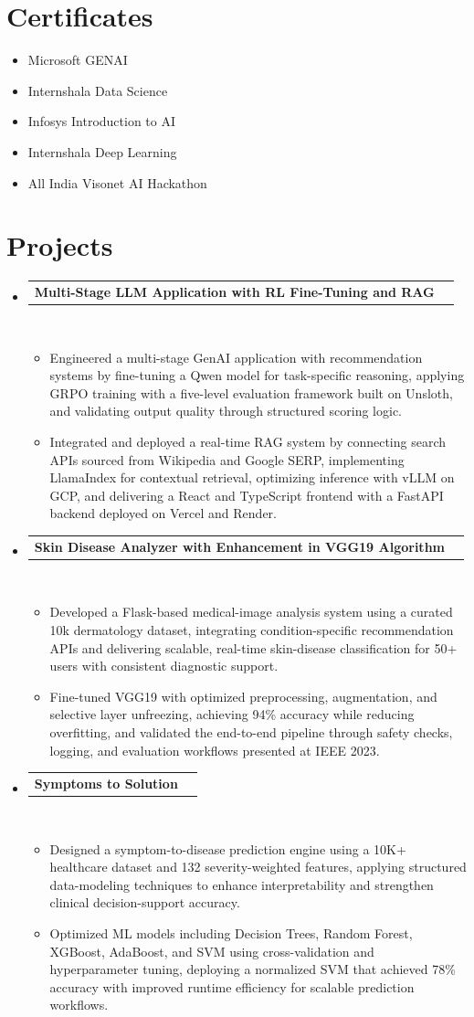 \documentclass[letterpaper,11pt]{article}
\newcommand{\resumeItem}[1]{\item\small{{#1 \vspace{-3pt}}}}
\newcommand{\resumeProjectHeading}[2]{
    \vspace{-3pt}\item
    \begin{tabularx}{0.995\textwidth}[t]{Xr}
      \small\textbf{#1} & #2 \\
    \end{tabularx}\\[-3pt]
    \vspace{3pt}
}
\newcommand{\resumeItemListStart}{\begin{itemize}}
\newcommand{\resumeItemListEnd}{\end{itemize}\vspace{-4pt}}
\newcommand{\resumeSubHeadingListStart}{
  \begin{itemize}[leftmargin=0.12in, label={}]
  \setlength{\itemsep}{0pt}
  \setlength{\parsep}{0pt}
  \setlength{\parskip}{0pt}
}
\newcommand{\resumeSubHeadingListEnd}{\end{itemize}}
\begin{document}
\section{Certificates}
\vspace{-4pt}
\resumeItemListStart
  \resumeItem{Microsoft GENAI}
  \resumeItem{Internshala Data Science}
  \resumeItem{Infosys Introduction to AI}
  \resumeItem{Internshala Deep Learning}
  \resumeItem{All India Visonet AI Hackathon}
\resumeItemListEnd

\section{Projects}
\resumeSubHeadingListStart
\resumeProjectHeading
  {Multi-Stage LLM Application with RL Fine-Tuning and RAG}{}
  \resumeItemListStart
    \resumeItem{Engineered a multi-stage GenAI application with recommendation systems by fine-tuning a Qwen model for task-specific reasoning, applying GRPO training with a five-level evaluation framework built on Unsloth, and validating output quality through structured scoring logic.}
    \resumeItem{Integrated and deployed a real-time RAG system by connecting search APIs sourced from Wikipedia and Google SERP, implementing LlamaIndex for contextual retrieval, optimizing inference with vLLM on GCP, and delivering a React and TypeScript frontend with a FastAPI backend deployed on Vercel and Render.}
  \resumeItemListEnd

\resumeProjectHeading
  {Skin Disease Analyzer with Enhancement in VGG19 Algorithm}{}
  \resumeItemListStart
    \resumeItem{Developed a Flask-based medical-image analysis system using a curated 10k dermatology dataset, integrating condition-specific recommendation APIs and delivering scalable, real-time skin-disease classification for 50+ users with consistent diagnostic support.}
    \resumeItem{Fine-tuned VGG19 with optimized preprocessing, augmentation, and selective layer unfreezing, achieving 94\% accuracy while reducing overfitting, and validated the end-to-end pipeline through safety checks, logging, and evaluation workflows presented at IEEE 2023.}
  \resumeItemListEnd

\resumeProjectHeading
  {Symptoms to Solution}{}
  \resumeItemListStart
    \resumeItem{Designed a symptom-to-disease prediction engine using a 10K+ healthcare dataset and 132 severity-weighted features, applying structured data-modeling techniques to enhance interpretability and strengthen clinical decision-support accuracy.}
    \resumeItem{Optimized ML models including Decision Trees, Random Forest, XGBoost, AdaBoost, and SVM using cross-validation and hyperparameter tuning, deploying a normalized SVM that achieved 78\% accuracy with improved runtime efficiency for scalable prediction workflows.}
  \resumeItemListEnd
\resumeSubHeadingListEnd
\end{document}
